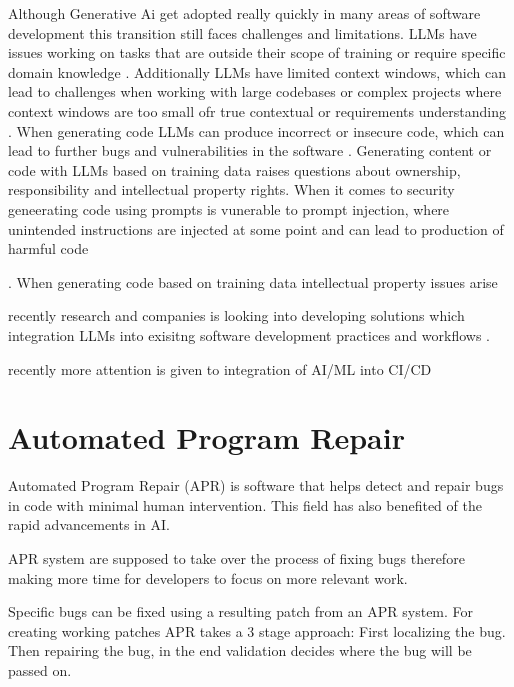 Although Generative Ai get adopted really quickly in many areas of software development this transition still faces challenges and limitations.
LLMs have issues working on tasks that are outside their scope of training or require specific domain knowledge \cite{houLargeLanguageModels2024}.
Additionally LLMs have limited context windows, which can lead to challenges when working with large codebases or complex projects where context windows are too small ofr true contextual or requirements understanding \cite{bhargavmallampatiRoleGenerativeAI2025}.
When generating code LLMs can produce incorrect or insecure code, which can lead to further bugs and vulnerabilities in the software \cite{houLargeLanguageModels2024}.
Generating content or code with LLMs based on training data raises questions about ownership, responsibility and intellectual property rights.
When it comes to security geneerating code using prompts is vunerable to prompt injection, where unintended instructions are injected at some point and can lead to production of harmful code \cite{}

\cite{bhargavmallampatiRoleGenerativeAI2025, houLargeLanguageModels2024}.
When generating code based on training data intellectual property issues arise  \cite{sauvolaFutureSoftwareDevelopment2024}


recently research and companies is looking into developing solutions which integration LLMs into exisitng software development practices and workflows  \cite{puvvadiCodingAgentsComprehensive2025, dohmkeGitHubCopilotMeet2025, ntroducingCodex, sauvolaFutureSoftwareDevelopment2024}.

recently more attention is given to integration of AI/ML into CI/CD
\cite{mohammedAIDrivenContinuousIntegration2024}

\section{Automated Program Repair}

Automated Program Repair (APR) is software that helps detect and repair bugs in code with minimal human intervention. This field has also benefited of the rapid advancements in AI.

APR system are supposed to take over the process of fixing bugs therefore making more time for developers to focus on more relevant work. \cite{houLargeLanguageModels2024}

Specific bugs can be fixed using a resulting patch from an APR system. For creating working patches APR takes a 3 stage approach: First localizing the bug. Then repairing the bug, in the end validation decides where the bug will be passed on.\cite{}

